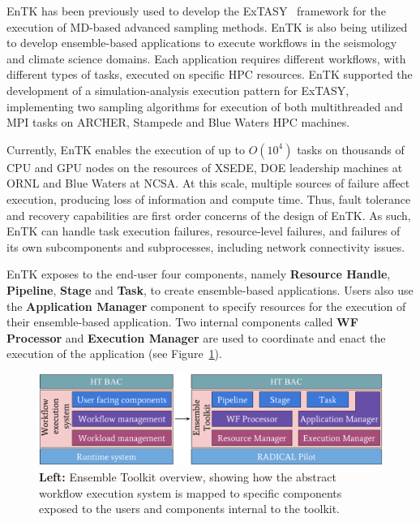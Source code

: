 \documentclass[conference]{IEEEtran}
\begin{document}
%
%

EnTK has been previously used to develop the
ExTASY~\cite{balasubramanian2016extasy} framework for the execution of
MD-based advanced sampling methods. EnTK is also being utilized to develop
ensemble-based applications to execute workflows in the seismology and
climate science domains. Each application requires different workflows, with
different types of tasks, executed on specific HPC resources. EnTK supported
the development of a simulation-analysis execution pattern for ExTASY,
implementing two sampling algorithms for execution of both multithreaded and
MPI tasks on ARCHER, Stampede and Blue Waters HPC machines.

%
%
%
%

Currently, EnTK enables the execution of up to \(O(10^4)\) tasks on thousands
of CPU and GPU nodes on the resources of XSEDE, DOE leadership machines
at ORNL and Blue Waters at NCSA. At this scale, multiple sources of failure
affect execution, producing loss of information and compute time. Thus, fault
tolerance and recovery capabilities are first order concerns of the design of
EnTK\@. As such, EnTK can handle task execution failures, resource-level
failures, and failures of its own subcomponents and subprocesses, including
network connectivity issues.

EnTK exposes to the end-user four components, namely \textbf{Resource Handle}, \textbf{Pipeline}, \textbf{Stage} and \textbf{Task}, to create ensemble-based applications. Users
also use the \textbf{Application Manager} component to specify resources for
the execution of their ensemble-based application. Two internal components
called \textbf{WF Processor} and \textbf{Execution Manager} are used
to coordinate and enact the execution of the application (see
Figure~\ref{fig:entk_arch}).

\begin{figure}
  \centering
  \includegraphics[width=\columnwidth]{entk_overview.pdf}
  \caption{\textbf{Left:} Ensemble Toolkit overview, showing how the abstract
           workflow execution system is mapped to specific components exposed
           to the users and components internal to the
           toolkit.}\label{fig:entk_arch}
\end{figure}
\end{document}
